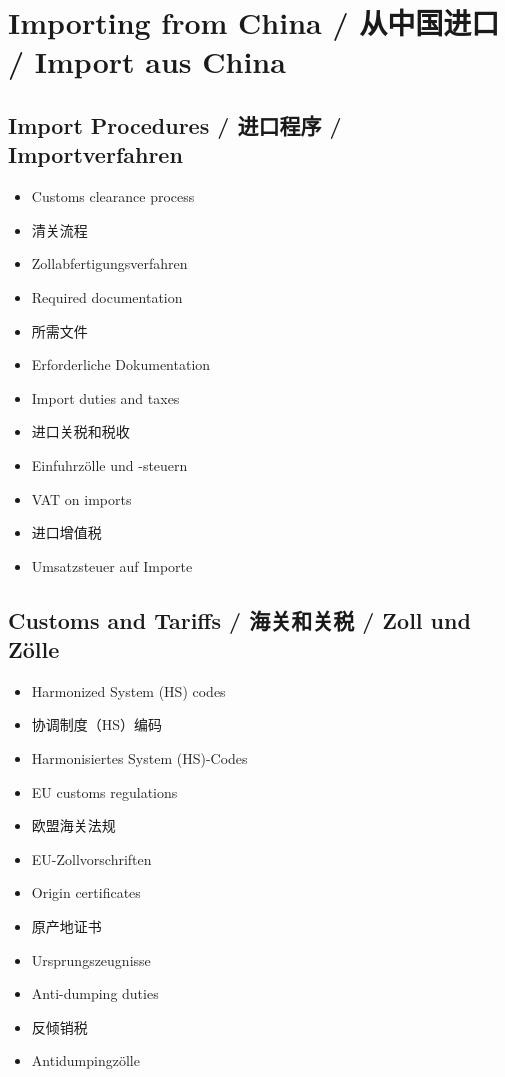 \section{Importing from China / 从中国进口 / Import aus China}

\subsection{Import Procedures / 进口程序 / Importverfahren}
\begin{itemize}
    \item Customs clearance process
    \item 清关流程
    \item Zollabfertigungsverfahren
    \item Required documentation
    \item 所需文件
    \item Erforderliche Dokumentation
    \item Import duties and taxes
    \item 进口关税和税收
    \item Einfuhrzölle und -steuern
    \item VAT on imports
    \item 进口增值税
    \item Umsatzsteuer auf Importe
\end{itemize}

\subsection{Customs and Tariffs / 海关和关税 / Zoll und Zölle}
\begin{itemize}
    \item Harmonized System (HS) codes
    \item 协调制度（HS）编码
    \item Harmonisiertes System (HS)-Codes
    \item EU customs regulations
    \item 欧盟海关法规
    \item EU-Zollvorschriften
    \item Origin certificates
    \item 原产地证书
    \item Ursprungszeugnisse
    \item Anti-dumping duties
    \item 反倾销税
    \item Antidumpingzölle
\end{itemize}

